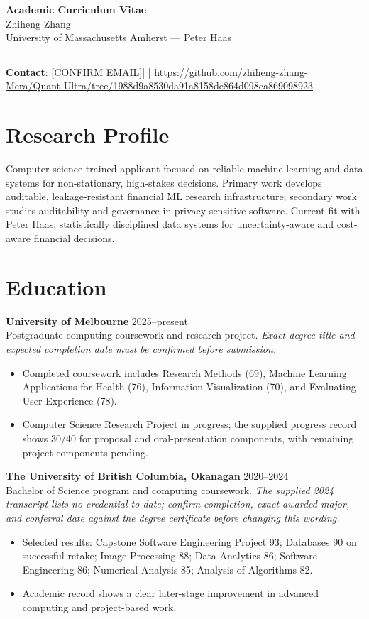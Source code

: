 \documentclass[11pt]{article}
\newcommand{\ApplicantName}{Zhiheng Zhang}
\newcommand{\ApplicantEmail}{[CONFIRM EMAIL]}
\newcommand{\ApplicantPhone}{[CONFIRM PHONE]}
\newcommand{\ApplicantGitHub}{\url{https://github.com/zhiheng-zhang-Mera/Quant-Ultra/tree/1988d9a8530da91a8158de864d098ea869098923}}
\begin{document}
\begin{center}
{\LARGE\bfseries Academic Curriculum Vitae}\\[0.25em]
{\large \ApplicantName}\\
University of Massachusetts Amherst --- Peter Haas
\end{center}
\vspace{0.35em}\hrule\vspace{0.65em}

\textbf{Contact}: \ApplicantEmail\quad | \quad \ApplicantPhone\quad | \quad \ApplicantGitHub

\section*{Research Profile}
Computer-science-trained applicant focused on reliable machine-learning and data systems for non-stationary, high-stakes decisions. Primary work develops auditable, leakage-resistant financial ML research infrastructure; secondary work studies auditability and governance in privacy-sensitive software. Current fit with Peter Haas: statistically disciplined data systems for uncertainty-aware and cost-aware financial decisions.

\section*{Education}
\textbf{University of Melbourne} \hfill 2025--present\\
Postgraduate computing coursework and research project. \textit{Exact degree title and expected completion date must be confirmed before submission.}
\begin{itemize}
\item Completed coursework includes Research Methods (69), Machine Learning Applications for Health (76), Information Visualization (70), and Evaluating User Experience (78).
\item Computer Science Research Project in progress; the supplied progress record shows 30/40 for proposal and oral-presentation components, with remaining project components pending.
\end{itemize}

\textbf{The University of British Columbia, Okanagan} \hfill 2020--2024\\
Bachelor of Science program and computing coursework. \textit{The supplied 2024 transcript lists no credential to date; confirm completion, exact awarded major, and conferral date against the degree certificate before changing this wording.}
\begin{itemize}
\item Selected results: Capstone Software Engineering Project 93; Databases 90 on successful retake; Image Processing 88; Data Analytics 86; Software Engineering 86; Numerical Analysis 85; Analysis of Algorithms 82.
\item Academic record shows a clear later-stage improvement in advanced computing and project-based work.
\end{itemize}
\end{document}
